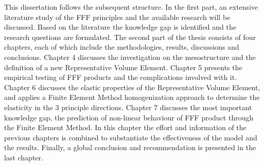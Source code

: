 This dissertation follows the subsequent structure. In the first part, an extensive literature study of the FFF principles and the available research will be discussed. Based on the literature the knowledge gap is identified and the research questions are formulated. The second part of the thesis consists of four chapters, each of which include the methodologies, results, discussions and conclusions. Chapter 4 discusses the investigation on the mesostructure and the definition of a new Representative Volume Element. Chapter 5 presents the empirical testing of FFF products and the complications involved with it. Chapter 6 discusses the elastic properties of the Representative Volume Element, and applies a Finite Element Method homogenization approach to determine the elasticity in the 3 principle directions. Chapter 7 discusses the most important knowledge gap, the prediction of non-linear behaviour of FFF product through the Finite Element Method. In this chapter the effort and information of the previous chapters is combined to substantiate the effectiveness of the model and  the results. Finally, a global conclusion and recommendation is presented in the last chapter. 












